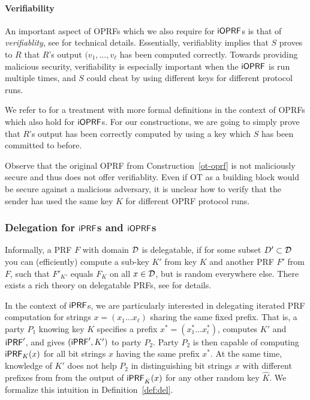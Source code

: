 \paragraph{Verifiability}
An important aspect of OPRFs which we also require for $\mathsf{i}\mathsf{OPRF}$s is
that of \emph{verifiablity}, see \citet{kia} for technical
details. Essentially, verifiablity implies that $S$ proves to $R$ that
$R$'s output $(v_1,\ldots,v_\ell$ has been computed correctly. Towards
providing malicious security, verifiability is especially important
when the $\mathsf{i}\mathsf{OPRF}$ is run multiple times, and $S$ could cheat by using
different keys for different protocol runs.

We refer to \cite{kia} for a treatment with more formal definitions in
the context of OPRFs which also hold for $\mathsf{i}\mathsf{OPRF}$s.  For our
constructions, we are going to simply prove that $R$'s output has been
correctly computed by using a key which $S$ has been committed to
before.

Observe that the original OPRF from Construction~\ref{ot-oprf} is not
maliciously secure and thus does not offer verifiablity. Even if OT as
a building block would be secure against a malicious adversary, it is
unclear how to verify that the sender has used the same key $K$ for
different OPRF protocol runs.

\subsubsection{Delegation for $\mathsf{i}\mathsf{PRF}$s and $\mathsf{i}\mathsf{OPRF}$s}
Informally, a PRF $F$ with domain ${\mathcal{D}}$ is delegatable, if for some
subset $D'\subset{\mathcal{D}}$ you can (efficiently) compute a sub-key $K'$ from
key $K$ and another PRF $F'$ from $F$, such that $F'_{K'}$ equals
$F_K$ on all $x\in{\mathcal{D}}$, but is random everywhere else. There exists a
rich theory on delegatable PRFs, see \citet{delegate} for details.

In the context of $\mathsf{i}\mathsf{PRF}$s, we are particularly interested in
delegating iterated PRF computation for strings
$x=(x_1\ldots{}x_\ell)$ sharing the same fixed prefix. That is, a
party $P_1$ knowing key $K$ specifies a prefix
$x^*=(x^*_1\ldots{}x^*_i)$, computes $K'$ and $\mathsf{i}\mathsf{PRF}'$, and gives
$(\mathsf{i}\mathsf{PRF}',K')$ to party $P_2$. Party $P_2$ is then capable of computing
$\mathsf{i}\mathsf{PRF}_K(x)$ for all bit strings $x$ having the same prefix $x^*$. At
the same time, knowledge of $K'$ does not help $P_2$ in
distinguishing bit strings $x$ with different prefixes from from the
output of $\mathsf{i}\mathsf{PRF}_{\hat{K}}(x)$ for any other random key $\hat{K}$.  We
formalize this intuition in Definition~\ref{def:del}.

